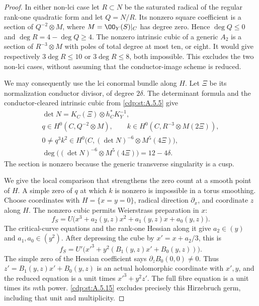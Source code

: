 \begin{proof}
In either non-lci case let $R\subset N$ be the saturated
radical of the regular rank-one quadratic form and let
$Q=N/R$. Its nonzero square coefficient is a section of
$Q^{-2}\otimes M$, where $M=\OO_Y(S)|_C$ has degree
zero. Hence $\deg Q\le0$ and $\deg R=4-\deg Q\ge4$.
The nonzero intrinsic cubic of a generic $A_2$ is a
section of $R^{-3}\otimes M$ with poles of total degree
at most ten, or eight. It would give respectively
$3\deg R\le10$ or $3\deg R\le8$, both impossible.
This excludes the two non-lci cases, without assuming
that the conductor-image scheme is reduced.

We may consequently use the lci conormal bundle along $H$.
Let $\Xi$ be its normalization conductor divisor, of degree
$2\delta$. The determinant formula and the
conductor-cleared intrinsic cubic from \ref{cdp:st:A.5.5} give
\[
\begin{gathered}
 \det N=K_C(\Xi)\otimes h_C^*K_Y^{-1},\\
 q\in H^0(C,Q^{-2}\otimes M),\qquad
 k\in H^0(C,R^{-3}\otimes M(2\Xi)),\\
 0\ne q^3k^2\in
 H^0\bigl(C,(\det N)^{-6}\otimes M^5(4\Xi)\bigr),\\
 \deg\bigl((\det N)^{-6}\otimes M^5(4\Xi)\bigr)
                         =12-4\delta .
\end{gathered}                                  \tag{C.RA.13}\label{cdp:eq:C.RA.13}
\]
The section is nonzero because the generic transverse
singularity is a cusp.

We give the local comparison that strengthens the zero
count at a smooth point of $H$. A simple zero of $q$ at
which $k$ is nonzero is impossible in a torus smoothing.
Choose coordinates with $H=\{x=y=0\}$, radical direction
$\partial_x$, and coordinate $z$ along $H$.
The nonzero cubic permits Weierstrass preparation in $x$:
\[
 f_S=U\bigl(x^3+a_2(y,z)x^2+a_1(y,z)x+a_0(y,z)\bigr).
 \tag{C.RA.14}\label{cdp:eq:C.RA.14}
\]
The critical-curve equations and the rank-one Hessian
along it give $a_2\in(y)$ and $a_1,a_0\in(y^2)$.
After depressing the cube by $x'=x+a_2/3$, this is
\[
 f_S=U'\bigl(x'^3+y^2(B_1(y,z)x'+B_0(y,z))\bigr).
 \tag{C.RA.15}\label{cdp:eq:C.RA.15}
\]
The simple zero of the Hessian coefficient says
$\partial_zB_0(0,0)\ne0$. Thus
$z'=B_1(y,z)x'+B_0(y,z)$ is an actual holomorphic
coordinate with $x',y$, and the reduced equation is a
unit times $x'^3+y^2z'$. The full fibre equation is a
unit times its $m$th power. \ref{cdp:st:A.5.15} excludes precisely
this Hirzebruch germ, including that unit and multiplicity.


\end{proof}
